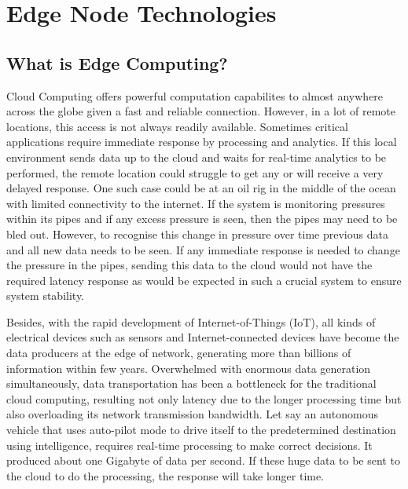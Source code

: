 
\section{Edge Node Technologies}
\label{edge_node_technologies}
\subsection{What is Edge Computing?}

Cloud Computing offers powerful computation capabilites to almost anywhere across the globe given a fast and reliable connection. However, in a lot of remote locations, this access is not always readily available. Sometimes critical applications require immediate response by processing and analytics. If this local environment sends data up to the cloud and waits for real-time analytics to be performed, the remote location could struggle to get any or will receive a very delayed response. One such case could be at an oil rig in the middle of the ocean with limited connectivity to the internet. If the system is monitoring pressures within its pipes and if any excess pressure is seen, then the pipes may need to be bled out. However, to recognise this change in pressure over time previous data and all new data needs to be seen. If any immediate response is needed to change the pressure in the pipes, sending this data to the cloud would not have the required latency response as would be expected in such a crucial system to ensure system stability.

Besides, with the rapid development of Internet-of-Things (IoT), all kinds of electrical devices such as sensors and Internet-connected devices have become the data producers at the edge of network, generating more than billions of information within few years. Overwhelmed with enormous data generation simultaneously, data transportation has been a bottleneck for the traditional cloud computing, resulting not only latency due to the longer processing time but also overloading its network transmission bandwidth. Let say an autonomous vehicle that uses auto-pilot mode to drive itself to the predetermined destination using intelligence, requires real-time processing to make correct decisions. It produced about one Gigabyte of data per second. If these huge data to be sent to the cloud to do the processing, the response will take longer time.

